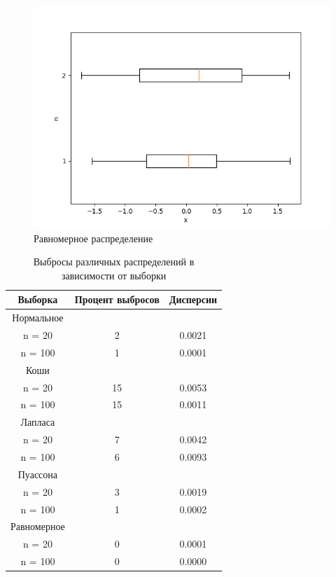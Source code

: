 \documentclass[a4]{article}
\begin{document}
\begin{center}
\begin{figure}[h]
					\includegraphics[width=\textwidth]{uniform.png}
					\caption[Равномерное распределение]{Равномерное распределение}
				\end{figure}
				
			\end{center}
			\newpage
			\begin{table}[h]
				
				\caption{Выбросы различных распределений в зависимости от выборки}
				\label{tab:my_label}
				\begin{center}
					\vspace{5mm}
					\begin{tabular}{|c|c|c|}
						\hline
						Выборка & Процент выбросов & Дисперсии\\
						\hline
						Нормальное	&\\
						\hline
						n = 20   & 	2  & 0.0021  \\
						\hline
						n = 100   &	1   & 0.0001 \\
						\hline
						Коши	&\\
						\hline
						n = 20   & 	15  & 0.0053  \\
						\hline
						n = 100  & 	15   & 0.0011 \\
						\hline
						Лапласа	&\\
						\hline
						n = 20    &	7   & 0.0042 \\
						\hline
						n = 100   &	6   & 0.0093 \\
						\hline
						Пуассона	&\\
						\hline
						n = 20   & 	3   & 0.0019 \\
						\hline
						n = 100  & 	1   & 0.0002 \\
						\hline
						Равномерное	&\\
						\hline
						n = 20    &	0   & 0.0001 \\
						\hline
						n = 100   &	0  & 0.0000 \\ 
						\hline
					\end{tabular}
					
				\end{center}
				
			\end{table}
			
\end{document}
